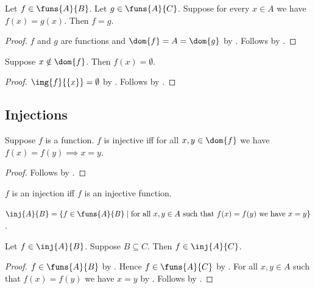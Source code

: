 \begin{theorem}\label{typed_functions_equal_from_agreement}
    Let $f\in\funs{A}{B}$.
    Let $g\in\funs{A}{C}$.
    Suppose for every $x\in A$ we have $f(x)=g(x)$.
    Then $f=g$.
\end{theorem}
\begin{proof}
    $f$ and $g$ are functions and $\dom{f}=A=\dom{g}$ by
        .
    Follows by .
\end{proof}

\begin{proposition}\label{function_apply_default}
    Suppose $x\notin\dom{f}$.
    Then $f(x) = \emptyset$.
\end{proposition}
\begin{proof}
    $\img{f}{\{x\}} = \emptyset$ by .
    Follows by .
\end{proof}



\subsection{Injections}

\begin{proposition}\label{injective_function}
    Suppose $f$ is a function.
    $f$ is injective iff for all $x,y\in\dom{f}$ we have $f(x) = f(y) \implies x = y$.
\end{proposition}
\begin{proof}
    Follows by .
\end{proof}

\begin{abbreviation}\label{injection}
    $f$ is an injection iff $f$ is an injective function.
\end{abbreviation}

\begin{definition}\label{inj}
    $\inj{A}{B} = \{f\in\funs{A}{B}\mid \text{for all $x,y\in A$ such that $f(x)=f(y)$ we have $x = y$}\}$.
\end{definition}

\begin{proposition}\label{inj_weaken_codom}
    Let $f\in\inj{A}{B}$.
    Suppose $B\subseteq C$.
    Then $f\in\inj{A}{C}$.
\end{proposition}
\begin{proof}
    $f\in\funs{A}{B}$ by .
    Hence $f\in\funs{A}{C}$ by .
    For all $x,y\in A$ such that $f(x)=f(y)$ we have $x=y$
        by .
    Follows by .
\end{proof}

